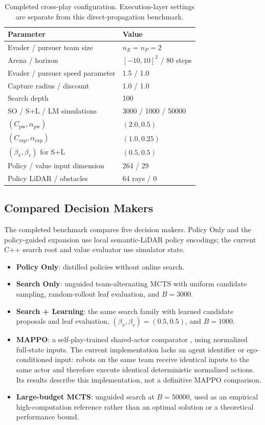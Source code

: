 \documentclass[letterpaper,10pt,conference]{ieeeconf}
\begin{document}
\begin{table}[t]
\centering\footnotesize
\caption{Completed cross-play configuration. Execution-layer settings
are separate from this direct-propagation benchmark.}
\label{tab:params}
\begin{tabularx}{\columnwidth}{@{}Yl@{}}\toprule
Parameter & Value \\ \midrule
Evader / pursuer team size & $n_E=n_P=2$ \\
Arena / horizon & $[-10,10]^2$ / 80 steps \\
Evader / pursuer speed parameter & 1.5 / 1.0 \\
Capture radius / discount & 1.0 / 1.0 \\
Search depth & 100 \\
SO / S+L / LM simulations & 3000 / 1000 / 50000 \\
$(C_{\mathrm{pw}},\alpha_{\mathrm{pw}})$ & $(2.0,0.5)$ \\
$(C_{\mathrm{exp}},\alpha_{\mathrm{exp}})$ & $(1.0,0.25)$ \\
$(\beta_\pi,\beta_v)$ for S+L & $(0.5,0.5)$ \\
Policy / value input dimension & 264 / 29 \\
Policy LiDAR / obstacles & 64 rays / 0 \\
\bottomrule\end{tabularx}
\end{table}

\subsection{Compared Decision Makers}

The completed benchmark compares five decision makers. Policy Only and
the policy-guided expansion use local semantic-LiDAR policy encodings;
the current C++ search root and value evaluator use simulator state.
\begin{itemize}
\item \textbf{Policy Only}: distilled policies without online search.
\item \textbf{Search Only}: unguided team-alternating MCTS with uniform
candidate sampling, random-rollout leaf evaluation, and $B=3000$.
\item \textbf{Search + Learning}: the same search family with learned
candidate proposals and leaf evaluation, $(\beta_\pi,\beta_v)=(0.5,0.5)$,
and $B=1000$.
\item \textbf{MAPPO}: a self-play-trained shared-actor comparator
\cite{yu2021surprising}, using normalized full-state inputs. The current
implementation lacks an agent identifier or ego-conditioned input:
robots on the same team receive identical inputs to the same actor and
therefore execute identical deterministic normalized actions. Its
results describe this implementation, not a definitive MAPPO comparison.
\item \textbf{Large-budget MCTS}: unguided search at $B=50000$,
used as an empirical high-computation reference rather than an optimal
solution or a theoretical performance bound.
\end{itemize}
\end{document}
